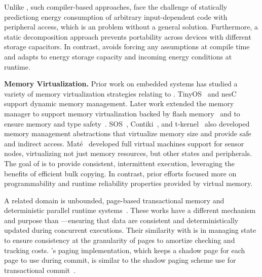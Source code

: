 Unlike \sys, such compiler-based approaches, face the challenge of statically predictiong energy consumption of arbitrary input-dependent code with peripheral access, which is an problem without a general solution. Furthermore, a static decomposition approach prevents portability across devices with different storage capacitors. In contrast, \sys avoids forcing any assumptions at compile time and adapts to energy storage capacity and incoming energy conditions at runtime.

\textbf{Memory Virtualization.} Prior work on embedded systems has studied a variety of memory virtualization strategies relating to \sys.
TinyOS~\cite{levis2005tinyos} and nesC~\cite{nesc} support dynamic memory management. Later work extended the memory manager to support memory virtualization backed by flash memory~\cite{sensornetvm} and to ensure memory and type safety~\cite{tinyosmemorysafety}. SOS~\cite{sos}, Contiki~\cite{contiki}, and t-kernel~\cite{tkernel} also developed memory management abstractions that virtualize memory size and provide safe and indirect access. Mat\'e~\cite{mate} developed full virtual machines support for sensor nodes, virtualizing not just memory resources, but other states and peripherals. The goal of \sys is to provide consistent, intermittent execution, leveraging the benefits of efficient bulk copying. In contrast, prior efforts focused more on programmability and runtime reliability properties provided by virtual memory.

A related domain is unbounded, page-based transactional memory and deterministic parallel runtime systems~\cite{pagebasedtm,grace}.  These works have a different mechanism and purpose than \sys---ensuring that data are consistent and deterministically updated during concurrent executions.  Their similarity with \sys is in managing state to ensure consistency at the granularity of pages to amortize checking and tracking costs. \sys's paging implementation, which keeps a shadow page for each page to use during commit, is similar to the shadow paging scheme use for transactional commit~\cite{pagebasedtm}.
